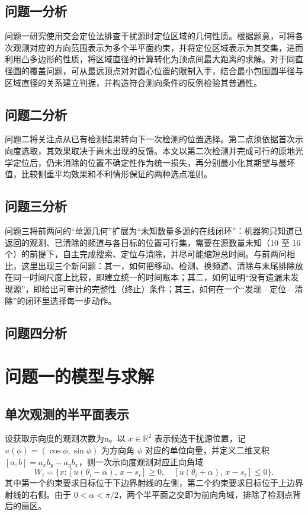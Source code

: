 \documentclass[UTF8,a4paper,zihao=-4,fontset=none]{ctexart}
\begin{document}
\subsection{问题一分析}

问题一研究使用交会定位法排查干扰源时定位区域的几何性质。根据题意，可将各次观测对应的方向范围表示为多个半平面约束，并将定位区域表示为其交集，进而利用凸多边形的性质，将区域直径的计算转化为顶点间最大距离的求解。对于同直径圆的覆盖问题，可从最远顶点对对圆心位置的限制入手，结合最小包围圆半径与区域直径的关系建立判据，并构造符合测向条件的反例检验其普遍性。

\subsection{问题二分析}

问题二将关注点从已有检测结果转向下一次检测的位置选择。第二点须依据首次示向度选取，其效果取决于尚未出现的反馈。本文以第二次检测并完成可行的原地光学定位后，仍未消除的位置不确定性作为统一损失，再分别最小化其期望与最坏值，比较侧重平均效果和不利情形保证的两种选点准则。
\subsection{问题三分析}

问题三将前两问的“单源几何”扩展为“未知数量多源的在线闭环”：机器狗只知道已返回的观测、已清除的频道与各目标的位置可行集，需要在源数量未知（10 至 16 个）的前提下，自主完成搜索、定位与清除，并尽可能缩短总时间。与前两问相比，这里出现三个新问题：其一，如何把移动、检测、换频道、清除与末尾排除放在同一时间尺度上比较，即建立统一的时间账本；其二，如何证明“没有遗漏未发现源”，即给出可审计的完整性（终止）条件；其三，如何在一个“发现—定位—清除”的闭环里选择每一步动作。

\subsection{问题四分析}


\section{问题一的模型与求解}

\subsection{单次观测的半平面表示}

设获取示向度的观测次数为n。以 \(x\in\mathbb R^2\) 表示候选干扰源位置，记 \(u(\phi)=(\cos\phi,\sin\phi)\) 为方向角 \(\phi\) 对应的单位向量，并定义二维叉积 \([a,b]=a_xb_y-a_yb_x\)，则一次示向度观测对应正向角域
\begin{equation}
  W_i=\{x:[u(\theta_i-\alpha),\,x-s_i]\ge0,\quad [u(\theta_i+\alpha),\,x-s_i]\le0\}.
  \label{eq:wedge}
\end{equation}
其中第一个约束要求目标位于下边界射线的左侧，第二个约束要求目标位于上边界射线的右侧。由于 \(0<\alpha<\pi/2\)，两个半平面之交即为前向角域，排除了检测点背后的扇区。
\end{document}
